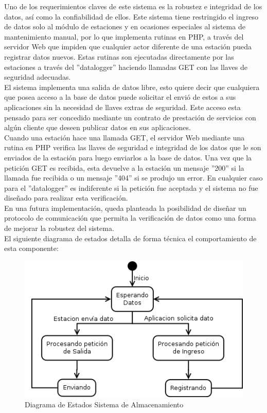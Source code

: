 Uno de los requerimientos claves de este sistema es la robustez e integridad de los datos, así como la confiabilidad de ellos. Este sistema tiene restringido el ingreso de datos solo al módulo de estaciones y en ocasiones especiales al sistema de mantenimiento manual, por lo que implementa rutinas en PHP, a través del servidor Web que impiden que cualquier actor diferente de una estación pueda registrar datos nuevos. Estas rutinas son ejecutadas directamente por las estaciones a través del ''datalogger'' haciendo llamadas GET con las llaves de seguridad adecuadas.\\
El sistema implementa una salida de datos libre, esto quiere decir que cualquiera que posea acceso a la base de datos puede solicitar el envió de estos a sus aplicaciones sin la necesidad de llaves extras de seguridad. Este acceso esta pensado para ser concedido mediante un contrato de prestación de servicios con algún cliente que deseen publicar datos en sus aplicaciones.\\

Cuando una estación hace una llamada GET, el servidor Web mediante una rutina en PHP verifica las llaves de seguridad e integridad de los datos que le son enviados de la estación para luego enviarlos a la base de datos. Una vez que la petición GET es recibida, esta devuelve a la estación un mensaje ''200'' si la llamada fue recibida o un mensaje ''404'' si se produjo un error. En cualquier caso para el ''datalogger'' es indiferente si la petición fue aceptada y el sistema no fue diseñado para realizar esta verificación.\\ En una futura implementación, queda planteada la posibilidad de diseñar un protocolo de comunicación que permita la verificación de datos como una forma de mejorar la robustez del sistema.\\

El siguiente diagrama de estados detalla de forma técnica el comportamiento de esta componente:
\begin{figure}[h!]
        \centering
        \includegraphics[scale=0.6]{images/datosEstados}
        \caption{Diagrama de Estados Sistema de Almacenamiento}
        \label{almacenamientoSecuencia}
\end{figure}

